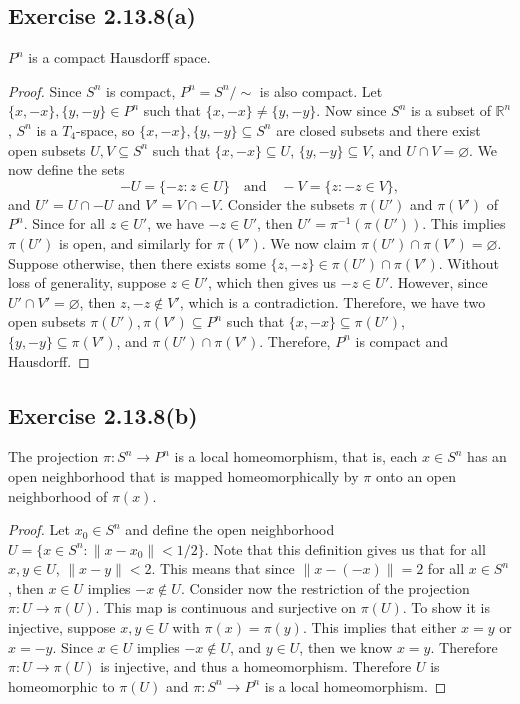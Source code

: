 \documentclass[12pt]{article}
\newenvironment{problem}
    {\begin{lrbox}{\mybox}\begin{minipage}{\textwidth-10pt}}
    {\end{minipage}\end{lrbox}\framebox[6.5in]{\usebox{\mybox}}}
\newcommand{\isp}[1]{\quad\text{#1}\quad}
\newcommand{\R}{\mathbb{R}}
\let\emptyset\varnothing
\begin{document}
\subsection*{Exercise 2.13.8(a)}
\begin{problem}
    $P^n$ is a compact Hausdorff space.
\end{problem}
\begin{proof}
    Since $S^n$ is compact, $P^n=S^n/\sim$ is also compact. Let $\{x,-x\},\{y,-y\}\in P^n$ such that $\{x,-x\}\ne \{y,-y\}$. Now since $S^n$ is a subset of $\R^n$, $S^n$ is a $T_4$-space, so $\{x,-x\},\{y,-y\}\subseteq S^n$ are closed subsets and there exist open subsets $U,V\subseteq S^n$ such that $\{x,-x\}\subseteq U$, $\{y,-y\}\subseteq V$, and $U\cap V = \emptyset$. We now define the sets
    \[-U = \{-z : z\in U\} \isp{and} -V=\{z:-z\in V\},\]
    and $U'=U\cap-U$ and $V'=V\cap-V$. Consider the subsets $\pi(U')$ and $\pi(V')$ of $P^n$. Since for all $z\in U'$, we have $-z\in U'$, then $U'=\pi^{-1}(\pi(U'))$. This implies $\pi(U')$ is open, and similarly for $\pi(V')$. We now claim $\pi(U')\cap\pi(V')=\emptyset$. Suppose otherwise, then there exists some $\{z,-z\}\in\pi(U')\cap\pi(V')$. Without loss of generality, suppose $z\in U'$, which then gives us $-z\in U'$. However, since $U'\cap V' = \emptyset$, then $z,-z\notin V'$, which is a contradiction. Therefore, we have two open subsets $\pi(U'),\pi(V')\subseteq P^n$ such that $\{x,-x\}\subseteq\pi(U')$, $\{y,-y\}\subseteq\pi(V')$, and $\pi(U')\cap\pi(V')$. Therefore, $P^n$ is compact and Hausdorff.
    
\end{proof}

\subsection*{Exercise 2.13.8(b)}
\begin{problem}
    The projection $\pi:S^n \to P^n$ is a local homeomorphism, that is, each $x\in S^n$ has an open neighborhood that is mapped homeomorphically by $\pi$ onto an open neighborhood of $\pi(x)$.
\end{problem}

\begin{proof}
    Let $x_0\in S^n$ and define the open neighborhood $U=\{x\in S^n : \|x-x_0\| < 1/2\}$. Note that this definition gives us that for all $x,y\in U$, $\|x-y\|<2$. This means that since $\|x-(-x)\|=2$ for all $x\in S^n$, then $x\in U$ implies $-x\notin U$. Consider now the restriction of the projection $\pi: U\to \pi(U)$. This map is continuous and surjective on $\pi(U)$. To show it is injective, suppose $x,y\in U$ with $\pi(x)=\pi(y)$. This implies that either $x=y$ or $x=-y$. Since $x\in U$ implies $-x\notin U$, and $y\in U$, then we know $x=y$. Therefore $\pi:U\to\pi(U)$ is injective, and thus a homeomorphism. Therefore $U$ is homeomorphic to $\pi(U)$ and $\pi:S^n\to P^n$ is a local homeomorphism.
    
\end{proof}
\end{document}
